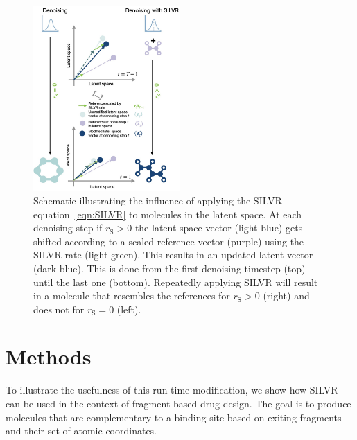 \documentclass[journal=jacsat,manuscript=article]{achemso}
\begin{document}
\begin{figure}
    \centering
    \includegraphics[width=0.5\textwidth]{paper/Figures/Fig2/fig2.jpg}
    \caption{Schematic illustrating the influence of applying the SILVR equation~\ref{eqn:SILVR} to molecules in the latent space. At each denoising step if $r_{\mathrm{S}}>0$ the latent space vector (light blue) gets shifted according to a scaled reference vector (purple) using the SILVR rate (light green). This results in an updated latent vector (dark blue). This is done from the first denoising timestep (top) until the last one (bottom). Repeatedly applying SILVR will result in a molecule that resembles the references for $r_{\mathrm{S}}>0$ (right) and does not for $r_{\mathrm{S}}=0$ (left).}
    \label{fig:silvr_explanation}
\end{figure}

\section{Methods}
To illustrate the usefulness of this run-time modification, we show how SILVR can be used in the context of fragment-based drug design. The goal is to produce molecules that are complementary to a binding site based on exiting fragments and their set of atomic coordinates. 
\end{document}
